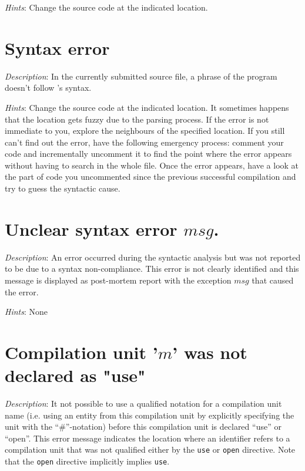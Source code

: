 {\em Hints}: Change the source code at the indicated location.



\section*{Syntax error}
{\em Description}: In the currently submitted source file, a phrase of
the program doesn't follow \focal's syntax.

{\em Hints}: Change the source code at the indicated location. It
sometimes happens that the location gets fuzzy due to the parsing
process. If the error is not immediate to you, explore the neighbours of
 the specified location. If you still can't find out the error,
have the following emergency process: comment your code and
incrementally uncomment it to find the point where the error appears
without having to search in the whole file. Once the error appears,
have a look at the part of code you uncommented since the previous
successful compilation and try to guess the syntactic cause.



\section*{Unclear syntax error $msg$.}
{\em Description}: An error occurred during the syntactic analysis but
was not reported to be due to a syntax non-compliance. This error is
not clearly identified and this message is displayed as post-mortem
report with the exception $msg$ that caused the error.

{\em Hints}: None



\section*{Compilation unit '$m$' was not declared as "use"}
{\em Description}: It not possible to use a qualified notation for a
compilation unit name (i.e. using an entity from this compilation unit
by explicitly specifying the unit with the ``\#''-notation) before this
compilation unit is declared ``use'' or ``open''. This error message
indicates the location where an identifier refers to a compilation
unit that was not qualified either by the {\tt use} or {\tt open}
directive. Note that the {\tt open} directive implicitly implies
{\tt use}.

